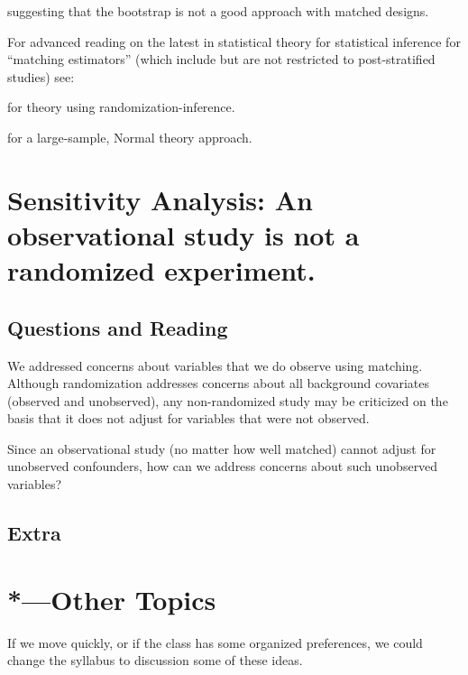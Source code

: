 \documentclass[10pt,letterpaper]{article}
\begin{document}
 suggesting that the bootstrap is not a good
approach with matched designs.

For advanced reading on the latest in statistical theory for
statistical inference for ``matching estimators'' (which include but
are not restricted to post-stratified studies) see:

 for theory using randomization-inference.

 for a large-sample, Normal theory approach.


\AdvanceDate[1]
\section{Sensitivity Analysis: An observational study is not a randomized experiment.}

\subsection{Questions and Reading}

We addressed concerns about variables that we do observe using matching.
Although randomization addresses concerns about all background covariates
(observed and unobserved), any non-randomized study may be criticized on the
basis that it does not adjust for variables that were not observed.

Since an observational study (no matter how well matched) cannot adjust for
unobserved confounders, how can we address concerns about such unobserved
variables?




\subsection{Extra}





\section{*---Other Topics}

If we move quickly, or if the class has some organized preferences, we could
change the syllabus to discussion some of these ideas.
\end{document}
